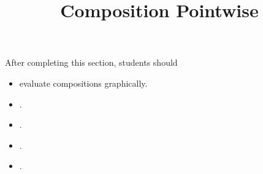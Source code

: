\documentclass{ximera}
\title{Composition Pointwise}
\begin{document}
\begin{abstract}
\end{abstract}
\maketitle

\begin{sectionOutcomes}
After completing this section, students should 

\begin{itemize}
\item evaluate compositions graphically.
\item .
\item .
\item .
\item .
\end{itemize}
\end{sectionOutcomes}
\end{document}
